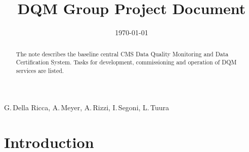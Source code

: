 \documentclass[a4paper]{cmspaper}
\newcommand{\pdfbookmark}[3][1]{}
\begin{document}

\begin{titlepage}

   \date{\today}
\smallskip
\smallskip
{}

\vspace{1cm}

\title{DQM Group Project Document\\[0.5cm]
\normalsize }

\vspace{1cm}

  \begin{Authlist}
    G.\,Della Ricca, A.\,Meyer, A.\,Rizzi, I.\,Segoni, L.\,Tuura
    
  \end{Authlist}


\vspace{1cm}

  \begin{abstract}
    \pdfbookmark[1]{Abstract}{Abstract}
    The note describes the baseline central CMS Data Quality Monitoring 
    and Data Certification System. Tasks for development, commissioning and 
    operation of DQM services are listed.
  \end{abstract} 

  
\end{titlepage}

\thispagestyle{empty}
\tableofcontents

\newpage

\setcounter{page}{1}%

\section{Introduction} 
\label{sec:introduction}
\end{document}
